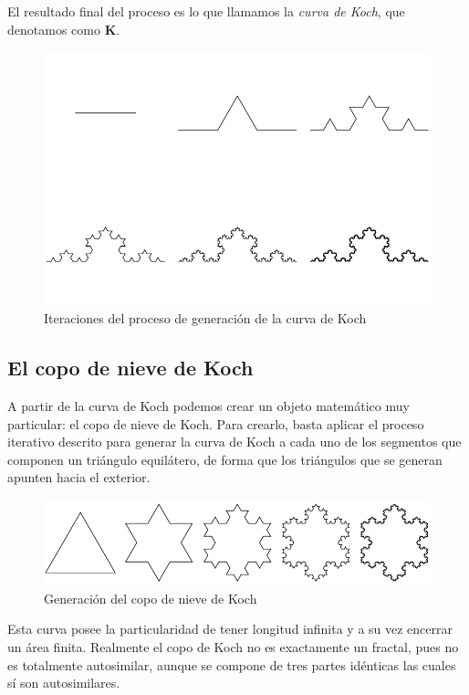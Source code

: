 El resultado final del proceso es lo que llamamos la \textit{curva de Koch}, que denotamos como \textbf{K}.

\begin{figure} [h]
\centering
\includegraphics[scale = 0.6]{img/curva-Koch.png}
\caption{Iteraciones del proceso de generación de la curva de Koch}
 \label{fig:curva-Koch}
\end{figure}

\subsection{El copo de nieve de Koch}
\label{subsection:copo-Koch}

A partir de la curva de Koch podemos crear un objeto matemático muy particular: el copo de nieve de Koch. Para crearlo, basta aplicar el proceso iterativo descrito para generar la curva de Koch a cada uno de los segmentos que componen un triángulo equilátero, de forma que los triángulos que se generan apunten hacia el exterior.


\begin{figure} [h]
\centering
\includegraphics[scale = 0.6]{img/copo-Koch.png}
\caption{Generación del copo de nieve de Koch}
 \label{fig:copo-Koch}
\end{figure}

Esta curva posee la particularidad de tener longitud infinita y a su vez encerrar un área finita. Realmente el copo de Koch no es exactamente un fractal, pues no es totalmente autosimilar, aunque se compone de tres partes idénticas las cuales sí son autosimilares.

